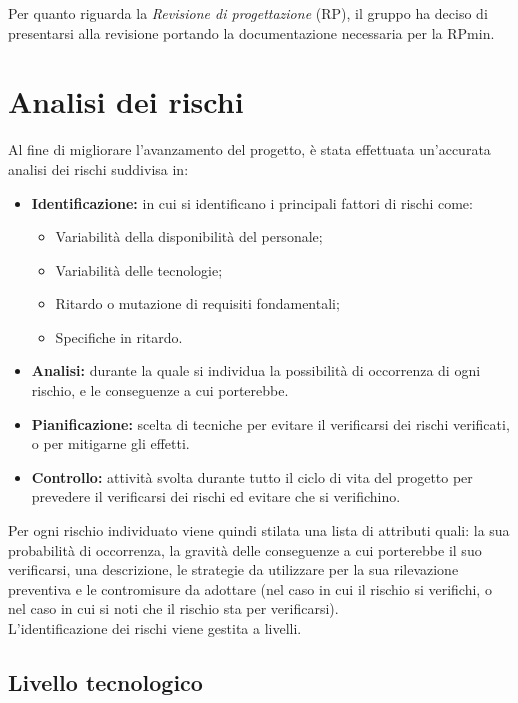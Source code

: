 \documentclass[a4paper]{article}
\begin{document}
			Per quanto riguarda la \emph{Revisione di progettazione} (RP), il gruppo ha deciso di presentarsi alla revisione
			portando la documentazione necessaria per la RPmin.
			
	\newpage 
	\section{Analisi dei rischi}
		Al fine di migliorare l'avanzamento del progetto, è stata effettuata un'accurata analisi dei rischi suddivisa in:
		\begin{itemize}
			\item \textbf{Identificazione:} in cui si identificano i principali fattori di rischi come:
			\begin{itemize}
				\item Variabilità della disponibilità del personale;
				\item Variabilità delle tecnologie;
				\item Ritardo o mutazione di requisiti fondamentali;
				\item Specifiche in ritardo.
			\end{itemize}
			\item \textbf{Analisi:} durante la quale si individua la possibilità di occorrenza di ogni rischio, e le conseguenze a cui porterebbe.
			\item \textbf{Pianificazione:} scelta di tecniche per evitare il verificarsi dei rischi verificati, o per mitigarne gli effetti.
			\item \textbf{Controllo:} attività svolta durante tutto il ciclo di vita del progetto per prevedere il verificarsi dei rischi
			ed evitare che si verifichino.
		\end{itemize}
		Per ogni rischio individuato viene quindi stilata una lista di attributi quali: la sua probabilità di occorrenza, la gravità delle 
		conseguenze a cui porterebbe il suo verificarsi, una descrizione, le strategie da utilizzare per la sua rilevazione preventiva e le 
		contromisure da adottare (nel caso in cui il rischio si verifichi, o nel caso in cui si noti che il rischio sta per verificarsi). \\
		L'identificazione dei rischi viene gestita a livelli.
		
		\subsection{Livello tecnologico}
\end{document}
